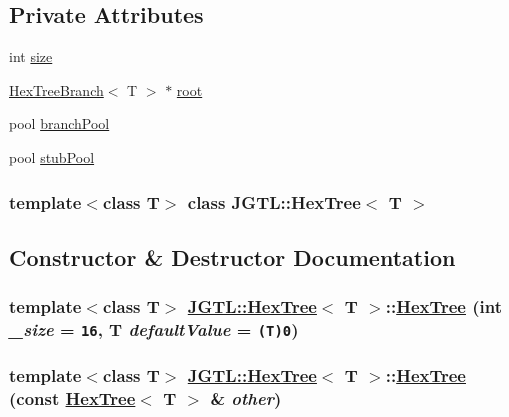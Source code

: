 \subsection*{Private Attributes}
\begin{CompactItemize}
\item 
int \hyperlink{class_j_g_t_l_1_1_hex_tree_6b9ceceeccc164dde96f9f4e75c62723}{size}
\item 
\hyperlink{class_j_g_t_l_1_1_hex_tree_branch}{Hex\-Tree\-Branch}$<$ T $>$ $\ast$ \hyperlink{class_j_g_t_l_1_1_hex_tree_5b04bc2334f5d662959cbaf5b57ba71e}{root}
\item 
pool \hyperlink{class_j_g_t_l_1_1_hex_tree_0491463e043431f5a10b5cffc1eabdf3}{branch\-Pool}
\item 
pool \hyperlink{class_j_g_t_l_1_1_hex_tree_d0e61d442265093fe56a2b60979d7ad3}{stub\-Pool}
\end{CompactItemize}
\subsubsection*{template$<$class T$>$ class JGTL::Hex\-Tree$<$ T $>$}



\subsection{Constructor \& Destructor Documentation}
\hypertarget{class_j_g_t_l_1_1_hex_tree_0bc0009b14ba1373be655f7f8939759b}{
\subsubsection[HexTree]{\setlength{\rightskip}{0pt plus 5cm}template$<$class T$>$ \hyperlink{class_j_g_t_l_1_1_hex_tree}{JGTL::Hex\-Tree}$<$ T $>$::\hyperlink{class_j_g_t_l_1_1_hex_tree}{Hex\-Tree} (int {\em \_\-size} = {\tt 16}, T {\em default\-Value} = {\tt (T)0})}}
\label{class_j_g_t_l_1_1_hex_tree_0bc0009b14ba1373be655f7f8939759b}


\hypertarget{class_j_g_t_l_1_1_hex_tree_b33bd761f532e8a9489269bbb9816cc5}{
\subsubsection[HexTree]{\setlength{\rightskip}{0pt plus 5cm}template$<$class T$>$ \hyperlink{class_j_g_t_l_1_1_hex_tree}{JGTL::Hex\-Tree}$<$ T $>$::\hyperlink{class_j_g_t_l_1_1_hex_tree}{Hex\-Tree} (const \hyperlink{class_j_g_t_l_1_1_hex_tree}{Hex\-Tree}$<$ T $>$ \& {\em other})}}
\label{class_j_g_t_l_1_1_hex_tree_b33bd761f532e8a9489269bbb9816cc5}


